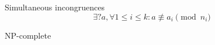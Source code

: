 \begin{frame}{Simultaneous incongruences}
  \[
	\exists? a, \forall 1 \le i \le k: a \not\equiv a_i \pmod{n_i} 
  \]

  \pause
  \vspace{0.50cm}
  \centerline{\textsf{NP}-complete}
\end{frame}
\begin{frame}[noframenumbering]
\end{frame}
